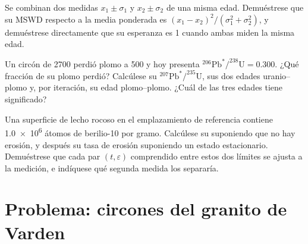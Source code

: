 \begin{exercise}[$\star\star\star$]\label{exo:b3:advanced-geochronology:10}
Se combinan dos medidas $x_1 \pm \sigma_1$ y $x_2 \pm \sigma_2$ de una misma
edad. Demuéstrese que su MSWD respecto a la media ponderada es
$(x_1 - x_2)^2/(\sigma_1^2 + \sigma_2^2)$, y demuéstrese directamente que su
esperanza es 1 cuando ambas miden la misma edad.
\end{exercise}

\begin{exercise}[$\star\star\star$]\label{exo:b3:advanced-geochronology:11}
Un circón de \qty{2700}{\Ma} perdió plomo a \qty{500}{\Ma} y hoy presenta
$^{206}\mathrm{Pb}^*/^{238}\mathrm{U} = 0.300$. ¿Qué fracción de su plomo
perdió? Calcúlese su $^{207}\mathrm{Pb}^*/^{235}\mathrm{U}$, sus dos edades uranio--plomo
y, por iteración, su edad plomo--plomo. ¿Cuál de las tres edades tiene
significado?
\end{exercise}

\begin{exercise}[$\star\star\star$]\label{exo:b3:advanced-geochronology:12}
Una superficie de lecho rocoso en el emplazamiento de referencia contiene \num{1.0e6} átomos de
berilio-10 por gramo. Calcúlese su  suponiendo que no hay erosión, y después su
tasa de erosión suponiendo un estado estacionario. Demuéstrese que cada par $(t, \varepsilon)$
comprendido entre estos dos límites se ajusta a la medición, e indíquese qué segunda
medida los separaría.
\end{exercise}

\section{Problema: circones del granito de Varden}


